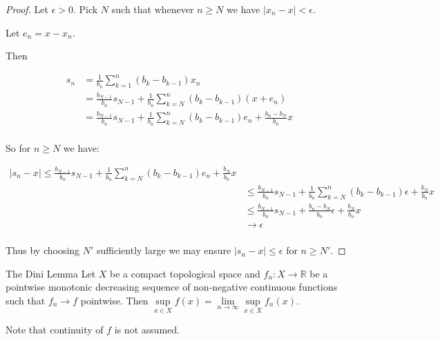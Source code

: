 \begin{proof}
Let \(\epsilon > 0\).
Pick \(N\) such that whenever \(n \geq N\) we have \(|x_n - x| < \epsilon\).

Let \(e_n = x - x_n\).

Then 

\begin{align*}
s_n &= \frac{1}{b_n} \sum\limits_{k = 1}^n (b_k - b_{k - 1}) x_n\\
&= \frac{b_{N - 1}}{b_n} s_{N - 1} + \frac{1}{b_n} \sum\limits_{k = N}^n (b_k - b_{k - 1}) (x + e_n) \\
&= \frac{b_{N - 1}}{b_n} s_{N - 1} + \frac{1}{b_n} \sum\limits_{k = N}^n (b_k - b_{k - 1}) e_n + \frac{b_n - b_N}{b_n} x \\
\end{align*}

So for \(n \geq N\) we have:

\begin{align*}
|s_n - x| \leq \frac{b_{N - 1}}{b_n} s_{N - 1} + \frac{1}{b_n} \sum\limits_{k = N}^n (b_k - b_{k - 1}) e_n + \frac{b_N}{b_n} x \\
&\leq \frac{b_{N - 1}}{b_n} s_{N - 1} + \frac{1}{b_n} \sum\limits_{k = N}^n (b_k - b_{k - 1}) \epsilon + \frac{b_N}{b_n} x \\
&\leq \frac{b_{N - 1}}{b_n} s_{N - 1} + \frac{b_n - b_N}{b_n} \epsilon + \frac{b_N}{b_n} x \\
&\to \epsilon \\
\end{align*}

Thus by choosing \(N'\) sufficiently large we may ensure \(|s_n - x| \leq \epsilon\) for \(n \geq N'\).
\end{proof}

\begin{lemma}{The Dini Lemma}
Let \(X\) be a compact topological space and \(f_n: X \to \mathbb{R}\) be a pointwise monotonic decreasing sequence of non-negative continuous functions such that \(f_n \to f\) pointwise.
Then \(\sup\limits_{x \in X} f(x) = \lim\limits_{n \to \infty} \sup\limits_{x \in X} f_n(x)\).

Note that continuity of \(f\) is not assumed.
\end{lemma}

